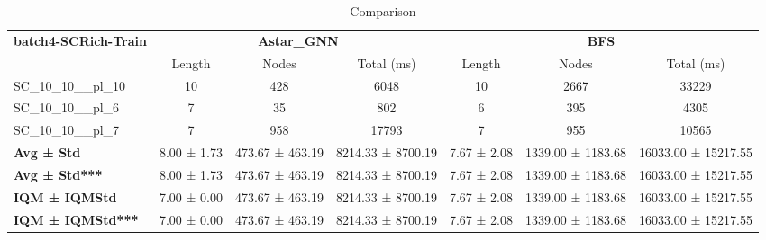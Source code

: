\begin{table}[!ht]
\centering
\small
\begin{tabular}{l|ccc|ccc}
\multirow{2}{*}{\textbf{batch4-SCRich-Train}} & \multicolumn{3}{c|}{\textbf{Astar\_GNN}} & \multicolumn{3}{c}{\textbf{BFS}} \\
\cline{2-7}
& Length & Nodes & Total (ms) & Length & Nodes & Total (ms) \\
\hline
SC\_10\_10\_\_pl\_10 & 10 & 428 & 6048 & 10 & 2667 & 33229 \\
SC\_10\_10\_\_pl\_6 & 7 & 35 & 802 & 6 & 395 & 4305 \\
SC\_10\_10\_\_pl\_7 & 7 & 958 & 17793 & 7 & 955 & 10565 \\
\hline
\textbf{Avg ± Std} & 8.00 ± 1.73 & 473.67 ± 463.19 & 8214.33 ± 8700.19 & 7.67 ± 2.08 & 1339.00 ± 1183.68 & 16033.00 ± 15217.55 \\
\textbf{Avg ± Std***} & 8.00 ± 1.73 & 473.67 ± 463.19 & 8214.33 ± 8700.19 & 7.67 ± 2.08 & 1339.00 ± 1183.68 & 16033.00 ± 15217.55 \\
\textbf{IQM ± IQMStd} & 7.00 ± 0.00 & 473.67 ± 463.19 & 8214.33 ± 8700.19 & 7.67 ± 2.08 & 1339.00 ± 1183.68 & 16033.00 ± 15217.55 \\
\textbf{IQM ± IQMStd***} & 7.00 ± 0.00 & 473.67 ± 463.19 & 8214.33 ± 8700.19 & 7.67 ± 2.08 & 1339.00 ± 1183.68 & 16033.00 ± 15217.55 \\
\end{tabular}
\caption{Comparison}
\label{tab:batch4_SCRich_comparison_train}
\end{table}
